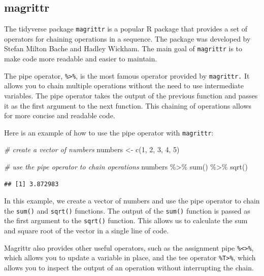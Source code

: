 \documentclass[
]{book}
\newenvironment{Shaded}{\begin{snugshade}}{\end{snugshade}}
\newcommand{\CommentTok}[1]{\textcolor[rgb]{0.56,0.35,0.01}{\textit{#1}}}
\newcommand{\DecValTok}[1]{\textcolor[rgb]{0.00,0.00,0.81}{#1}}
\newcommand{\FunctionTok}[1]{\textcolor[rgb]{0.00,0.00,0.00}{#1}}
\newcommand{\NormalTok}[1]{#1}
\newcommand{\OtherTok}[1]{\textcolor[rgb]{0.56,0.35,0.01}{#1}}
\newcommand{\SpecialCharTok}[1]{\textcolor[rgb]{0.00,0.00,0.00}{#1}}
\begin{document}
\hypertarget{magrittr}{%
\subsection{magrittr}\label{magrittr}}

The tidyverse package \texttt{magrittr} is a popular R package that provides a set of operators for chaining operations in a sequence. The package was developed by Stefan Milton Bache and Hadley Wickham. The main goal of \texttt{magrittr} is to make code more readable and easier to maintain.

The pipe operator, \texttt{\%\textgreater{}\%}, is the most famous operator provided by \texttt{magrittr.} It allows you to chain multiple operations without the need to use intermediate variables. The pipe operator takes the output of the previous function and passes it as the first argument to the next function. This chaining of operations allows for more concise and readable code.

Here is an example of how to use the pipe operator with \texttt{magrittr}:

\begin{Shaded}
\begin{Highlighting}[]
\CommentTok{\# create a vector of numbers}
\NormalTok{numbers }\OtherTok{\textless{}{-}} \FunctionTok{c}\NormalTok{(}\DecValTok{1}\NormalTok{, }\DecValTok{2}\NormalTok{, }\DecValTok{3}\NormalTok{, }\DecValTok{4}\NormalTok{, }\DecValTok{5}\NormalTok{)}

\CommentTok{\# use the pipe operator to chain operations}
\NormalTok{numbers }\SpecialCharTok{\%\textgreater{}\%}
  \FunctionTok{sum}\NormalTok{() }\SpecialCharTok{\%\textgreater{}\%}
  \FunctionTok{sqrt}\NormalTok{()}
\end{Highlighting}
\end{Shaded}

\begin{verbatim}
## [1] 3.872983
\end{verbatim}

In this example, we create a vector of numbers and use the pipe operator to chain the \texttt{sum()} and \texttt{sqrt()} functions. The output of the \texttt{sum()} function is passed as the first argument to the \texttt{sqrt()} function. This allows us to calculate the sum and square root of the vector in a single line of code.

Magrittr also provides other useful operators, such as the assignment pipe \texttt{\%\textless{}\textgreater{}\%}, which allows you to update a variable in place, and the tee operator \texttt{\%T\textgreater{}\%}, which allows you to inspect the output of an operation without interrupting the chain.
\end{document}
